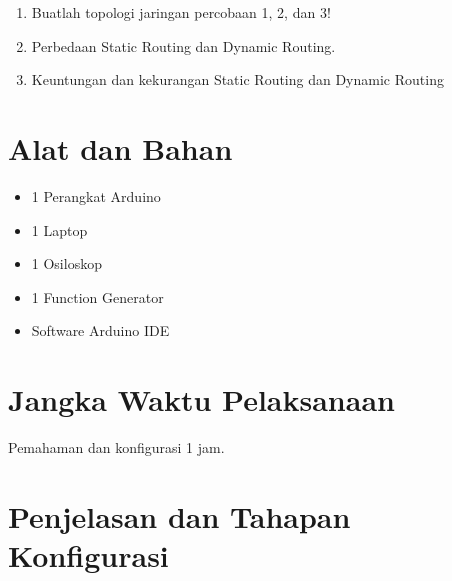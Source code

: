 \begin{center}
	\colorbox{cyan!30}{\parbox{0.8\linewidth}{
		\begin{enumerate}
		\item Buatlah topologi jaringan percobaan 1, 2, dan 3!
		\item Perbedaan Static Routing dan Dynamic Routing.
		\item Keuntungan dan kekurangan Static Routing dan Dynamic Routing
	\end{enumerate}
	}}
\end{center}

\section{Alat dan Bahan}
\begin{itemize}[label=$\bullet$, itemsep=-1pt, leftmargin=*]
	\item 1 Perangkat Arduino
	\item 1 Laptop
	\item 1 Osiloskop
	\item 1 Function Generator
	\item Software Arduino IDE
\end{itemize}

\section{Jangka Waktu Pelaksanaan}
Pemahaman dan konfigurasi 1 jam.

\section{Penjelasan dan Tahapan Konfigurasi}

